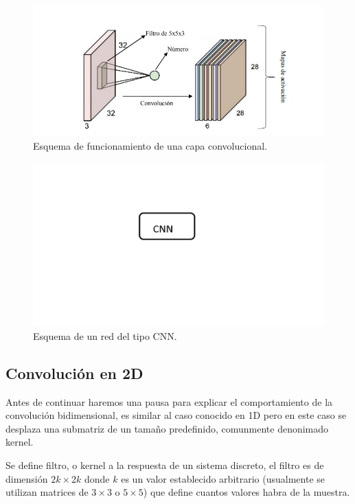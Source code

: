 \begin{figure}
    \centering
    \includegraphics[width=1\textwidth]{imgs/capa-convolucional.jpeg}
    \caption{Esquema de funcionamiento de una capa convolucional.}
    \label{fig:esquema-capa-convolucional}
\end{figure}
\begin{figure}
    \centering
    \includegraphics[width=1\textwidth]{imgs/CNN-completa.jpg}
    \caption{Esquema de un red del tipo CNN.}
    \label{fig:esquema-CNN}
\end{figure}

\subsection{Convolución en 2D}

Antes de continuar haremos una pausa para explicar el comportamiento de la convolución bidimensional, es similar al caso conocido en 1D pero
en este caso se desplaza una submatriz de un tamaño predefinido, comunmente denonimado kernel.

Se define filtro, o kernel a la respuesta de un sistema discreto, el filtro es de dimensión $2k \times 2k$ donde $k$ es un
valor establecido arbitrario (usualmente se utilizan matrices de $3 \times 3$ o $5 \times 5$) que define cuantos valores habra de la muestra.


